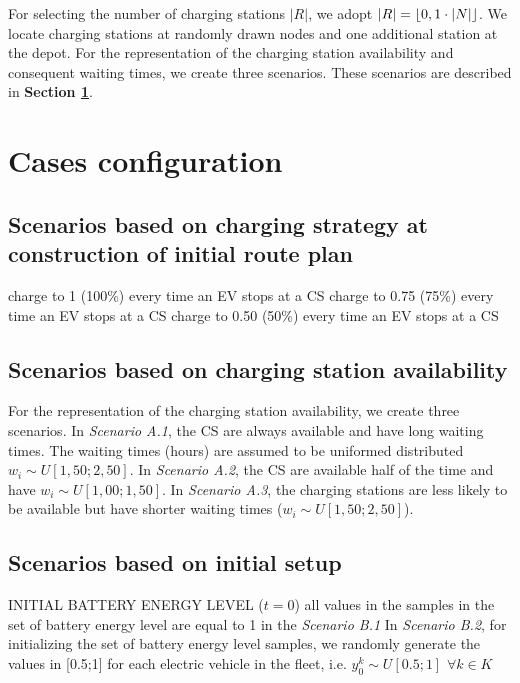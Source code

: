 \documentclass[11pt]{article}
\DeclarePairedDelimiter\floor{\lfloor}{\rfloor}
\begin{document}
For selecting the number of charging stations $|R|$, we adopt $|R| = \floor{0,1 \cdot |N|}$. We locate charging stations at randomly drawn nodes and one additional station at the depot. For the representation of the charging station availability and consequent waiting times, we create three scenarios. These scenarios are described in \textbf{Section \ref{section:cases}}.

\section{Cases configuration}
\label{section:cases}
\subsection{Scenarios based on charging strategy at construction of initial route plan}
charge to 1 (100\%) every time an EV stops at a CS
charge to 0.75 (75\%) every time an EV stops at a CS
charge to 0.50 (50\%) every time an EV stops at a CS


\subsection{Scenarios based on charging station availability}
For the representation of the charging station availability, we create three scenarios. In \textit{Scenario A.1}, the CS are always available and have long waiting times. The waiting times (hours) are assumed to be uniformed distributed $w_i \sim U[1,50;2,50]$. In \textit{Scenario A.2}, the CS are available half of the time and have $w_i \sim U[1,00;1,50]$. In \textit{Scenario A.3}, the charging stations are less likely to be available but have shorter waiting times ($w_i \sim U[1,50;2,50]$).

\subsection{Scenarios based on initial setup}
INITIAL BATTERY ENERGY LEVEL  ($t = 0$)
all values in the samples in the set of battery energy level are equal to 1 in the \textit{Scenario B.1}
In \textit{Scenario B.2}, for initializing the set of battery energy level samples, we randomly generate the values in [0.5;1] for each electric vehicle in the fleet, i.e. $y^k_0 \sim U[0.5;1]$ $\forall k \in K$ 
\end{document}
